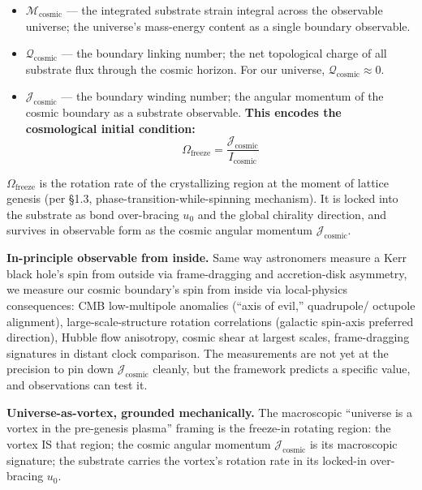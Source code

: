 \begin{itemize}
\item $\mathcal{M}_{\text{cosmic}}$ --- the integrated substrate strain
  integral across the observable universe; the universe's mass-energy
  content as a single boundary observable.

\item $\mathcal{Q}_{\text{cosmic}}$ --- the boundary linking number;
  the net topological charge of all substrate flux through the cosmic
  horizon. For our universe, $\mathcal{Q}_{\text{cosmic}} \approx 0$.

\item $\mathcal{J}_{\text{cosmic}}$ --- the boundary winding number;
  the angular momentum of the cosmic boundary as a substrate observable.
  \textbf{This encodes the cosmological initial condition:}
\begin{equation}
\Omega_{\text{freeze}} = \frac{\mathcal{J}_{\text{cosmic}}}{I_{\text{cosmic}}}
\label{eq:cosmic_J_as_IC}
\end{equation}
\end{itemize}

$\Omega_{\text{freeze}}$ is the rotation rate of the crystallizing region at
the moment of lattice genesis (per  \S{}1.3,
phase-transition-while-spinning mechanism). It is locked into the substrate
as bond over-bracing $u_0$ and the global chirality direction, and survives
in observable form as the cosmic angular momentum $\mathcal{J}_{\text{cosmic}}$.

\textbf{In-principle observable from inside.} Same way astronomers measure
a Kerr black hole's spin from outside via frame-dragging and accretion-disk
asymmetry, we measure our cosmic boundary's spin from inside via local-physics
consequences: CMB low-multipole anomalies (``axis of evil,'' quadrupole/
octupole alignment), large-scale-structure rotation correlations (galactic
spin-axis preferred direction), Hubble flow anisotropy, cosmic shear at
largest scales, frame-dragging signatures in distant clock comparison.
The measurements are not yet at the precision to pin down $\mathcal{J}_{\text{cosmic}}$
cleanly, but the framework predicts a specific value, and observations
can test it.

\textbf{Universe-as-vortex, grounded mechanically.} The macroscopic
``universe is a vortex in the pre-genesis plasma'' framing is the freeze-in
rotating region: the vortex IS that region; the cosmic angular momentum
$\mathcal{J}_{\text{cosmic}}$ is its macroscopic signature; the substrate
carries the vortex's rotation rate in its locked-in over-bracing $u_0$.

